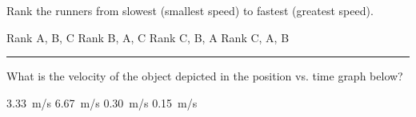 \documentclass[]{exam}
\begin{document}
\begin{questions}


Rank the runners from slowest (smallest speed) to fastest (greatest speed).

\begin{randomizechoices}
    \choice Rank A, B, C 
    \correctchoice Rank B, A, C
    \choice Rank C, B, A
    \choice Rank C, A, B
\end{randomizechoices}

\bigskip
\hrule


\question
What is the velocity of the object depicted in the position vs. time graph below?

\begin{center}
\end{center}

\begin{randomizeoneparchoices}[norandomize]
    \correctchoice \SI{3.33}{m/s}
    \choice \SI{6.67}{m/s}
    \choice \SI{0.30}{m/s}
    \choice \SI{0.15}{m/s}
\end{randomizeoneparchoices}    



\end{questions}
\end{document}
